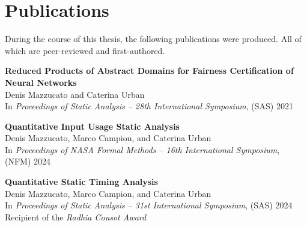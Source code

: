 
\newcommand\tab[1][1em]{\hspace*{#1}}

\chapter*{Publications}


During the course of this thesis, the following publications were produced. All of which are peer-reviewed and first-authored.


\vspace{3em}


\textbf{Reduced Products of Abstract Domains for Fairness Certification of Neural Networks}\\
\tab Denis Mazzucato and Caterina Urban \\
\tab In \emph{Proceedings of Static Analysis -- 28th International Symposium}, (SAS) 2021

\vspace{1.5em}

\textbf{Quantitative Input Usage Static Analysis}\\
\tab Denis Mazzucato, Marco Campion, and Caterina Urban \\
\tab In \emph{Proceedings of {NASA} Formal Methods -- 16th International Symposium}, (NFM) 2024

\vspace{1.5em}

\textbf{Quantitative Static Timing Analysis}\\
\tab Denis Mazzucato, Marco Campion, and Caterina Urban \\
\tab In \emph{Proceedings of Static Analysis -- 31st International Symposium}, (SAS) 2024\\
\tab\tab Recipient of the \emph{Radhia Cousot Award}
